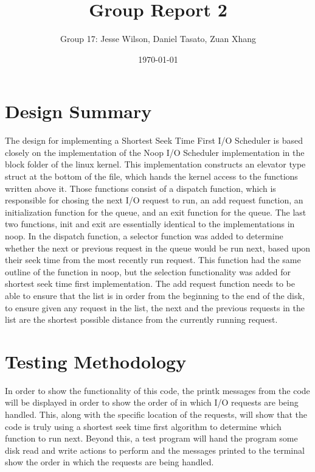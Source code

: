 \documentclass[a4paper]{article}
\title{Group Report 2}
\author{Group 17: Jesse Wilson, Daniel Tasato, Zuan Xhang}
\date{\today}
\begin{document}
\maketitle


\section{Design Summary}
The design for implementing a Shortest Seek Time First I/O Scheduler is based closely on the implementation of the Noop I/O Scheduler implementation in the block folder of the linux kernel. This implementation constructs an elevator type struct at the bottom of the file, which hands the kernel access to the functions written above it. Those functions consist of a dispatch function, which is responsible for chosing the next I/O request to run, an add request function, an initialization function for the queue, and an exit function for the queue. The last two functions, init and exit are essentially identical to the implementations in noop. In the dispatch function, a selector function was added to determine whether the next or previous request in the queue would be run next, based upon their seek time from the most recently run request. This function had the same outline of the function in noop, but the selection functionality was added for shortest seek time first implementation. The add request function needs to be able to ensure that the list is in order from the beginning to the end of the disk, to ensure given any request in the list, the next and the previous requests in the list are the shortest possible distance from the currently running request. 


\section{Testing Methodology}
In order to show the functionality of this code, the printk messages from the code will be displayed in order to show the order of in which I/O requests are being handled. This, along with the specific location of the requests, will show that the code is truly using a shortest seek time first algorithm to determine which function to run next. Beyond this, a test program will hand the program some disk read and write actions to perform and the messages printed to the terminal show the order in which the requests are being handled. 
\end{document}

